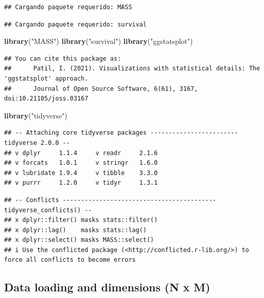 \documentclass[
]{article}
\newenvironment{Shaded}{\begin{snugshade}}{\end{snugshade}}
\newcommand{\FunctionTok}[1]{\textcolor[rgb]{0.13,0.29,0.53}{\textbf{#1}}}
\newcommand{\NormalTok}[1]{#1}
\newcommand{\StringTok}[1]{\textcolor[rgb]{0.31,0.60,0.02}{#1}}
\begin{document}
\begin{verbatim}
## Cargando paquete requerido: MASS
\end{verbatim}

\begin{verbatim}
## Cargando paquete requerido: survival
\end{verbatim}

\begin{Shaded}
\begin{Highlighting}[]
\FunctionTok{library}\NormalTok{(}\StringTok{"MASS"}\NormalTok{)}
\FunctionTok{library}\NormalTok{(}\StringTok{"survival"}\NormalTok{)}
\FunctionTok{library}\NormalTok{(}\StringTok{"ggstatsplot"}\NormalTok{)}
\end{Highlighting}
\end{Shaded}

\begin{verbatim}
## You can cite this package as:
##      Patil, I. (2021). Visualizations with statistical details: The 'ggstatsplot' approach.
##      Journal of Open Source Software, 6(61), 3167, doi:10.21105/joss.03167
\end{verbatim}

\begin{Shaded}
\begin{Highlighting}[]
\FunctionTok{library}\NormalTok{(}\StringTok{"tidyverse"}\NormalTok{)}
\end{Highlighting}
\end{Shaded}

\begin{verbatim}
## -- Attaching core tidyverse packages ------------------------ tidyverse 2.0.0 --
## v dplyr     1.1.4     v readr     2.1.6
## v forcats   1.0.1     v stringr   1.6.0
## v lubridate 1.9.4     v tibble    3.3.0
## v purrr     1.2.0     v tidyr     1.3.1
\end{verbatim}

\begin{verbatim}
## -- Conflicts ------------------------------------------ tidyverse_conflicts() --
## x dplyr::filter() masks stats::filter()
## x dplyr::lag()    masks stats::lag()
## x dplyr::select() masks MASS::select()
## i Use the conflicted package (<http://conflicted.r-lib.org/>) to force all conflicts to become errors
\end{verbatim}

\subsection{Data loading and dimensions (N x
M)}\label{data-loading-and-dimensions-n-x-m}
\end{document}
